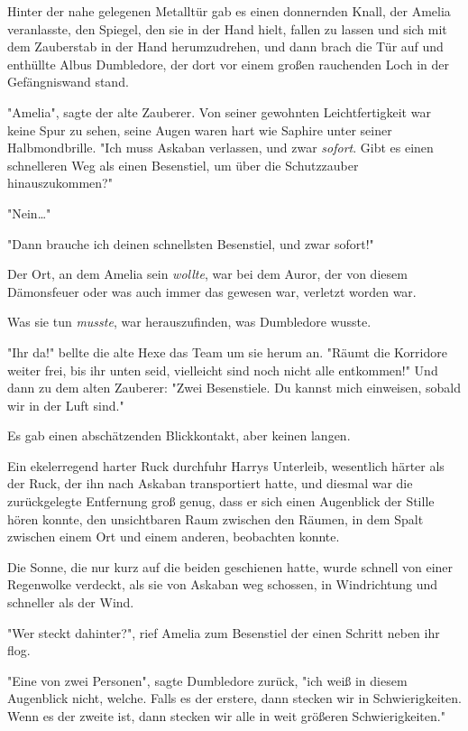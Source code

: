 {Hinter der nahe gelegenen Metalltür gab es einen donnernden Knall, der Amelia veranlasste, den Spiegel, den sie in der Hand hielt, fallen zu lassen und sich mit dem Zauberstab in der Hand herumzudrehen, und dann brach die Tür auf und enthüllte Albus Dumbledore, der dort vor einem großen rauchenden Loch in der Gefängniswand stand.

"Amelia", sagte der alte Zauberer. Von seiner gewohnten Leichtfertigkeit war keine Spur zu sehen, seine Augen waren hart wie Saphire unter seiner Halbmondbrille. "Ich muss Askaban verlassen, und zwar \emph{sofort}. Gibt es einen schnelleren Weg als einen Besenstiel, um über die Schutzzauber hinauszukommen?"

"Nein…"

"Dann brauche ich deinen schnellsten Besenstiel, und zwar sofort!"

Der Ort, an dem Amelia sein \emph{wollte}, war bei dem Auror, der von diesem Dämonsfeuer oder was auch immer das gewesen war, verletzt worden war.

Was sie tun \emph{musste}, war herauszufinden, was Dumbledore wusste.

"Ihr da!" bellte die alte Hexe das Team um sie herum an. "Räumt die Korridore weiter frei, bis ihr unten seid, vielleicht sind noch nicht alle entkommen!" Und dann zu dem alten Zauberer: "Zwei Besenstiele. Du kannst mich einweisen, sobald wir in der Luft sind."

Es gab einen abschätzenden Blickkontakt, aber keinen langen.

Ein ekelerregend harter Ruck durchfuhr Harrys Unterleib, wesentlich härter als der Ruck, der ihn nach Askaban transportiert hatte, und diesmal war die zurückgelegte Entfernung groß genug, dass er sich einen Augenblick der Stille hören konnte, den unsichtbaren Raum zwischen den Räumen, in dem Spalt zwischen einem Ort und einem anderen, beobachten konnte.

Die Sonne, die nur kurz auf die beiden geschienen hatte, wurde schnell von einer Regenwolke verdeckt, als sie von Askaban weg schossen, in Windrichtung und schneller als der Wind.

"Wer steckt dahinter?", rief Amelia zum Besenstiel der einen Schritt neben ihr flog.

"Eine von zwei Personen", sagte Dumbledore zurück, "ich weiß in diesem Augenblick nicht, welche. Falls es der erstere, dann stecken wir in Schwierigkeiten. Wenn es der zweite ist, dann stecken wir alle in weit größeren Schwierigkeiten."

}
